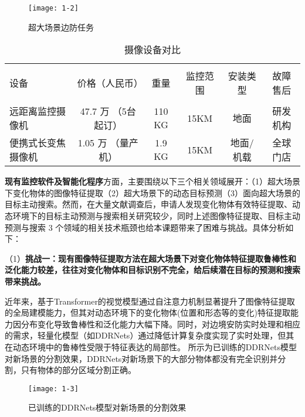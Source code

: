 \begin{figure}[h!]
\centering %
\texttt{[image: 1-2]}
\captionsetup{justification=centering} %
\caption{超大场景边防任务}
\label{fig:huge-scene-task}
\end{figure}


\begin{table}[htbp]
	\zhkai\ensong\selectfont%
	\centering  %
	\caption{摄像设备对比}  %
	\label{tab:device-comare}  %
	\begin{tabular}{l|c|c|c|c|c}  
		\hline  %
		& & & & & \\[-6pt]  %
		设备 & 价格（人民币）&重量&监控范围&安装类型&故障售后 \\  %
		\hline
		& &  & & & \\[-6pt]  %
		远距离监控摄像机 & 47.7 万 （5台起订）& 110 KG & 15KM &地面&研发机构 \\
		便携式长变焦摄像机 & 1.05 万 （量产机）& 1.9 KG & 15KM &地面/机载&全球门店 \\
		\hline
	\end{tabular}
\end{table}

\textbf{现有监控软件及智能化程序}方面，主要围绕以下三个相关领域展开：（1）超大场景下变化物体的图像特征提取（2）超大场景下的动态目标预测（3）面向超大场景的目标主动搜索。然而，在大量文献调查后，申请人发现变化物体有效特征提取、动态环境下的目标主动预测与搜索相关研究较少，同时上述图像特征提取、目标主动预测与搜索 3 个领域的相关技术瓶颈也给本课题带来了困难与挑战。具体分析如下：

（1）\textbf{挑战一：现有图像特征提取方法在超大场景下对变化物体特征提取鲁棒性和泛化能力较差，往往对变化物体和目标识别不完全，给后续潜在目标的预测和搜索带来挑战。}

近年来，基于Transformer的视觉模型\cite{dosovitskiy2020image,carion2020end,liu2021swin,zhu2021deformable,zheng2021rethinking,bao2021beit,he2021masked,liu2021tokens,wang2021pyramid}通过自注意力机制显著提升了图像特征提取的全局建模能力，但其对动态环境下的变化物体(位置和形态等的变化)特征提取能力因分布变化导致鲁棒性和泛化能力大幅下降。同时，对边境安防实时处理和相应的需求，轻量化模型（如DDRNets\cite{DBLP:journals/tits/PanHSJ23}）通过降低计算复杂度实现了实时处理，但其在动态环境中的鲁棒性受限于特征表达的局部性。
所示为已训练的DDRNets模型\cite{DBLP:journals/tits/PanHSJ23}对新场景的分割效果，DDRNets对新场景下的大部分物体都没有完全识别并分割，只有物体的部分区域分割正确。
\begin{figure}[h!]
\centering %
\texttt{[image: 1-3]}
\captionsetup{justification=centering} %
\caption{已训练的DDRNets模型对新场景的分割效果}
\label{fig:bad-gen-ab}
\end{figure}

